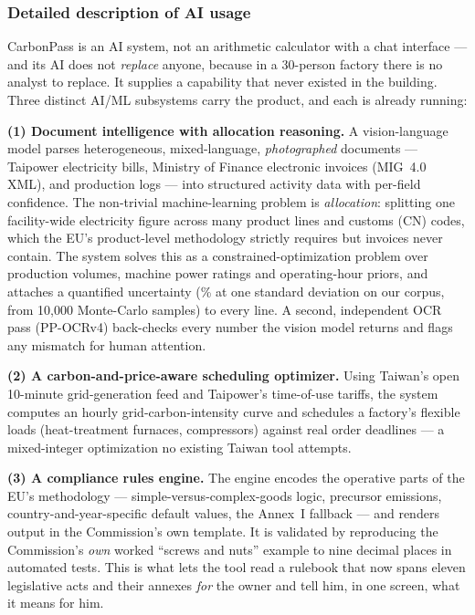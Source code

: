 \documentclass[11pt]{article}
\begin{document}
\subsubsection*{Detailed description of AI usage}
CarbonPass is an AI system, not an arithmetic calculator with a chat interface --- and its AI does not \emph{replace} anyone, because in a 30-person factory there is no analyst to replace. It supplies a capability that never existed in the building. Three distinct AI/ML subsystems carry the product, and each is already running:

\textbf{(1) Document intelligence with allocation reasoning.} A vision-language model parses heterogeneous, mixed-language, \emph{photographed} documents --- Taipower electricity bills, Ministry of Finance electronic invoices (MIG~4.0 XML), and production logs --- into structured activity data with per-field confidence. The non-trivial machine-learning problem is \emph{allocation}: splitting one facility-wide electricity figure across many product lines and customs (CN) codes, which the EU's product-level methodology strictly requires but invoices never contain. The system solves this as a constrained-optimization problem over production volumes, machine power ratings and operating-hour priors, and attaches a quantified uncertainty (\% at one standard deviation on our corpus, from 10{,}000 Monte-Carlo samples) to every line. A second, independent OCR pass (PP-OCRv4) back-checks every number the vision model returns and flags any mismatch for human attention.

\textbf{(2) A carbon-and-price-aware scheduling optimizer.} Using Taiwan's open 10-minute grid-generation feed and Taipower's time-of-use tariffs, the system computes an hourly grid-carbon-intensity curve and schedules a factory's flexible loads (heat-treatment furnaces, compressors) against real order deadlines --- a mixed-integer optimization no existing Taiwan tool attempts.

\textbf{(3) A compliance rules engine.} The engine encodes the operative parts of the EU's methodology --- simple-versus-complex-goods logic, precursor emissions, country-and-year-specific default values, the Annex~I fallback --- and renders output in the Commission's own template. It is validated by reproducing the Commission's \emph{own} worked ``screws and nuts'' example to nine decimal places in automated tests. This is what lets the tool read a rulebook that now spans eleven legislative acts and their annexes \emph{for} the owner and tell him, in one screen, what it means for him.
\end{document}
